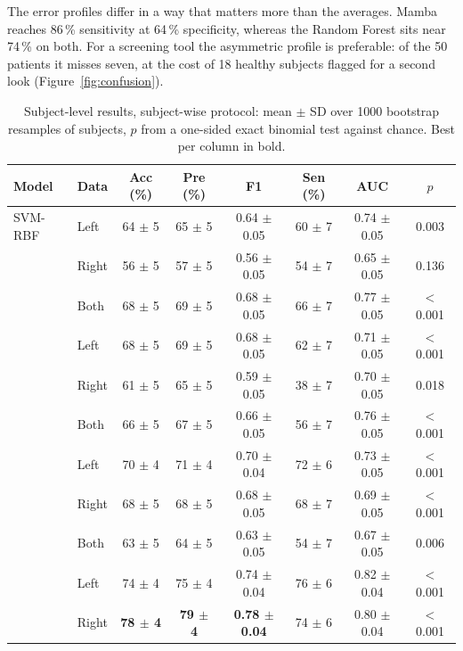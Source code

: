 The error profiles differ in a way that matters more than the averages. Mamba
reaches 86\,\% sensitivity at 64\,\% specificity, whereas the Random Forest sits
near 74\,\% on both. For a screening tool the asymmetric profile is preferable:
of the 50 patients it misses seven, at the cost of 18 healthy subjects flagged
for a second look (Figure~\ref{fig:confusion}).

\begin{table}[t]
  \centering
  \caption{Subject-level results, subject-wise protocol: mean $\pm$ SD over
  1000 bootstrap resamples of subjects, $p$ from a one-sided exact binomial
  test against chance. Best per column in bold.}
  \label{tab:main}
  \scriptsize
  \setlength{\tabcolsep}{1.6pt}
  \begin{tabular}{llcccccc}
    \toprule
    Model & Data & Acc (\%) & Pre (\%) & F1 & Sen (\%) & AUC & $p$ \\
    \midrule
    \multirow{1}{*}{SVM-RBF} & Left  & 64 $\pm$ 5 & 65 $\pm$ 5 & 0.64 $\pm$ 0.05 & 60 $\pm$ 7 & 0.74 $\pm$ 0.05 & 0.003 \\
     & Right & 56 $\pm$ 5 & 57 $\pm$ 5 & 0.56 $\pm$ 0.05 & 54 $\pm$ 7 & 0.65 $\pm$ 0.05 & 0.136 \\
     & Both  & 68 $\pm$ 5 & 69 $\pm$ 5 & 0.68 $\pm$ 0.05 & 66 $\pm$ 7 & 0.77 $\pm$ 0.05 & $<$0.001 \\
    \addlinespace[2pt]
    \multirow{1}{*}{1D-ResNet} & Left  & 68 $\pm$ 5 & 69 $\pm$ 5 & 0.68 $\pm$ 0.05 & 62 $\pm$ 7 & 0.71 $\pm$ 0.05 & $<$0.001 \\
     & Right & 61 $\pm$ 5 & 65 $\pm$ 5 & 0.59 $\pm$ 0.05 & 38 $\pm$ 7 & 0.70 $\pm$ 0.05 & 0.018 \\
     & Both  & 66 $\pm$ 5 & 67 $\pm$ 5 & 0.66 $\pm$ 0.05 & 56 $\pm$ 7 & 0.76 $\pm$ 0.05 & $<$0.001 \\
    \addlinespace[2pt]
    \multirow{1}{*}{LSTM} & Left  & 70 $\pm$ 4 & 71 $\pm$ 4 & 0.70 $\pm$ 0.04 & 72 $\pm$ 6 & 0.73 $\pm$ 0.05 & $<$0.001 \\
     & Right & 68 $\pm$ 5 & 68 $\pm$ 5 & 0.68 $\pm$ 0.05 & 68 $\pm$ 7 & 0.69 $\pm$ 0.05 & $<$0.001 \\
     & Both  & 63 $\pm$ 5 & 64 $\pm$ 5 & 0.63 $\pm$ 0.05 & 54 $\pm$ 7 & 0.67 $\pm$ 0.05 & 0.006 \\
    \addlinespace[2pt]
    \multirow{1}{*}{Random Forest} & Left  & 74 $\pm$ 4 & 75 $\pm$ 4 & 0.74 $\pm$ 0.04 & 76 $\pm$ 6 & 0.82 $\pm$ 0.04 & $<$0.001 \\
     & Right & \textbf{78 $\pm$ 4} & \textbf{79 $\pm$ 4} & \textbf{0.78 $\pm$ 0.04} & 74 $\pm$ 6 & 0.80 $\pm$ 0.04 & $<$0.001 \\

\end{tabular}
\end{table}
